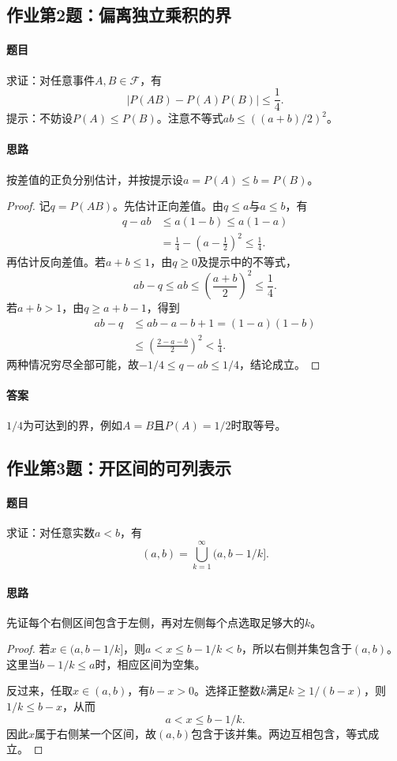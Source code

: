 \subsection{作业第2题：偏离独立乘积的界}\label{ex:w02-h2}
\paragraph{题目}
求证：对任意事件$A,B\in\mathscr F$，有
\[|P(AB)-P(A)P(B)|\leq\frac14.\]
提示：不妨设$P(A)\leq P(B)$。注意不等式$ab\leq((a+b)/2)^2$。
\paragraph{思路}按差值的正负分别估计，并按提示设$a=P(A)\leq b=P(B)$。
\begin{proof}
记$q=P(AB)$。先估计正向差值。由$q\leq a$与$a\leq b$，有
\begin{align*}
q-ab&\leq a(1-b)\leq a(1-a)\\
&=\frac14-\left(a-\frac12\right)^2\leq\frac14.
\end{align*}
再估计反向差值。若$a+b\leq1$，由$q\geq0$及提示中的不等式，
\[ab-q\leq ab\leq\left(\frac{a+b}{2}\right)^2\leq\frac14.\]
若$a+b>1$，由$q\geq a+b-1$，得到
\begin{align*}
ab-q&\leq ab-a-b+1=(1-a)(1-b)\\
&\leq\left(\frac{2-a-b}{2}\right)^2<\frac14.
\end{align*}
两种情况穷尽全部可能，故$-1/4\leq q-ab\leq1/4$，结论成立。
\end{proof}
\paragraph{答案}$1/4$为可达到的界，例如$A=B$且$P(A)=1/2$时取等号。

\subsection{作业第3题：开区间的可列表示}\label{ex:w02-h3}
\paragraph{题目}
求证：对任意实数$a<b$，有
\[(a,b)=\bigcup_{k=1}^{\infty}(a,b-1/k].\]
\paragraph{思路}先证每个右侧区间包含于左侧，再对左侧每个点选取足够大的$k$。
\begin{proof}
若$x\in(a,b-1/k]$，则$a<x\leq b-1/k<b$，所以右侧并集包含于$(a,b)$。这里当$b-1/k\leq a$时，相应区间为空集。

反过来，任取$x\in(a,b)$，有$b-x>0$。选择正整数$k$满足$k\geq1/(b-x)$，则$1/k\leq b-x$，从而
\[a<x\leq b-1/k.\]
因此$x$属于右侧某一个区间，故$(a,b)$包含于该并集。两边互相包含，等式成立。
\end{proof}
